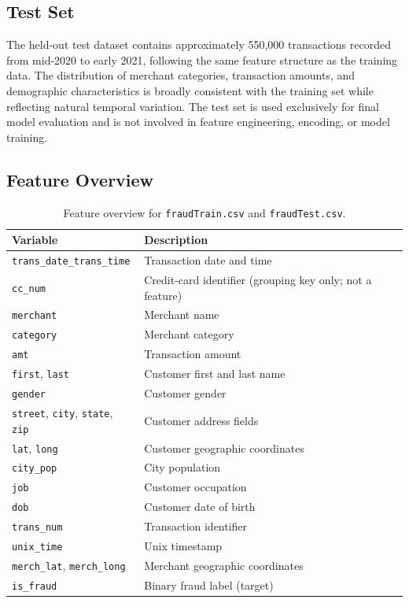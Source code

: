 \documentclass[oneside,12pt,parskip=half,american,numbers=noenddot]{scrreprt}
\begin{document}
\subsection*{Test Set}
The held-out test dataset contains approximately 550,000 transactions recorded from mid-2020 to early 2021, following the same feature structure as the training data. The distribution of merchant categories, transaction amounts, and demographic characteristics is broadly consistent with the training set while reflecting natural temporal variation. The test set is used exclusively for final model evaluation and is not involved in feature engineering, encoding, or model training.

\subsection*{Feature Overview}

\begin{table}[H]
\centering
\caption{Feature overview for \texttt{fraudTrain.csv} and \texttt{fraudTest.csv}.}
\label{tab:dataset_features}
\small
\renewcommand{\arraystretch}{1.15}
\begin{tabularx}{\textwidth}{lX}
\hline
\textbf{Variable} & \textbf{Description} \\
\hline
\texttt{trans\_date\_trans\_time} & Transaction date and time \\
\texttt{cc\_num} & Credit-card identifier (grouping key only; not a feature) \\
\texttt{merchant} & Merchant name \\
\texttt{category} & Merchant category \\
\texttt{amt} & Transaction amount \\
\texttt{first}, \texttt{last} & Customer first and last name \\
\texttt{gender} & Customer gender \\
\texttt{street}, \texttt{city}, \texttt{state}, \texttt{zip} & Customer address fields \\
\texttt{lat}, \texttt{long} & Customer geographic coordinates \\
\texttt{city\_pop} & City population \\
\texttt{job} & Customer occupation \\
\texttt{dob} & Customer date of birth \\
\texttt{trans\_num} & Transaction identifier \\
\texttt{unix\_time} & Unix timestamp \\
\texttt{merch\_lat}, \texttt{merch\_long} & Merchant geographic coordinates \\
\texttt{is\_fraud} & Binary fraud label (target) \\
\hline
\end{tabularx}
\end{table}
\end{document}

